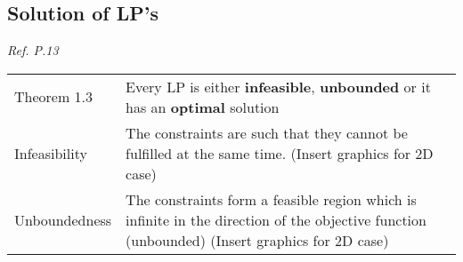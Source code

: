 \subsection{Solution of LP's}
{\itshape Ref. P.13}\\
\begin{tabular}{p{4cm} p{15cm}}
Theorem 1.3	& Every LP is either \textbf{infeasible}, \textbf{unbounded} or it has an \textbf{optimal} solution\\
Infeasibility	& The constraints are such that they cannot be fulfilled at the same time. (Insert graphics for 2D case)\\
Unboundedness	& The constraints form a feasible region which is infinite in the direction of the objective function (unbounded) (Insert graphics for 2D case)
\end{tabular}
